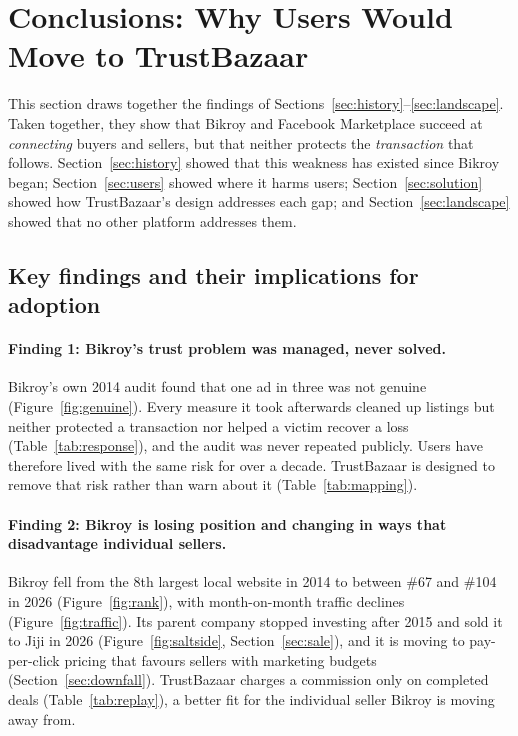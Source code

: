 \section{Conclusions: Why Users Would Move to TrustBazaar}
\label{sec:conclusion}

This section draws together the findings of
Sections~\ref{sec:history}--\ref{sec:landscape}. Taken together, they show that Bikroy and
Facebook Marketplace succeed at \emph{connecting} buyers and sellers, but that neither protects
the \emph{transaction} that follows. Section~\ref{sec:history} showed that this weakness has
existed since Bikroy began; Section~\ref{sec:users} showed where it harms users;
Section~\ref{sec:solution} showed how TrustBazaar's design addresses each gap; and
Section~\ref{sec:landscape} showed that no other platform addresses them.

\subsection{Key findings and their implications for adoption}

\paragraph{Finding 1: Bikroy's trust problem was managed, never solved.}
Bikroy's own 2014 audit found that one ad in three was not genuine (Figure~\ref{fig:genuine}).
Every measure it took afterwards cleaned up listings but neither protected a transaction nor
helped a victim recover a loss (Table~\ref{tab:response}), and the audit was never repeated
publicly. Users have therefore lived with the same risk for over a decade. TrustBazaar is
designed to remove that risk rather than warn about it (Table~\ref{tab:mapping}).

\paragraph{Finding 2: Bikroy is losing position and changing in ways that disadvantage
individual sellers.}
Bikroy fell from the 8th largest local website in 2014 to between \#67 and \#104 in 2026
(Figure~\ref{fig:rank}), with month-on-month traffic declines (Figure~\ref{fig:traffic}). Its
parent company stopped investing after 2015 and sold it to Jiji in 2026
(Figure~\ref{fig:saltside}, Section~\ref{sec:sale}), and it is moving to pay-per-click pricing
that favours sellers with marketing budgets (Section~\ref{sec:downfall}). TrustBazaar charges a
commission only on completed deals (Table~\ref{tab:replay}), a better fit for the individual
seller Bikroy is moving away from.

